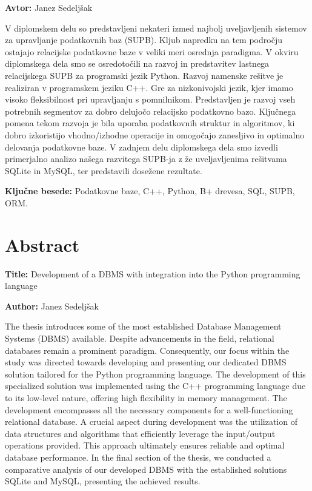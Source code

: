 \documentclass[a4paper,12pt,openright]{book}
\newcommand{\ttitleEn}{Development of a DBMS with integration into the Python programming language}
\newcommand{\tauthor}{Janez Sedeljšak}
\newcommand{\tkeywords}{Podatkovne baze, C++, Python, B+ drevesa, SQL, SUPB, ORM}
\newcommand{\clearemptydoublepage}{\newpage{\pagestyle{empty}\cleardoublepage}}
\begin{document}
\noindent\textbf{Avtor:} \tauthor
\bigskip

\noindent 
V diplomskem delu so predstavljeni nekateri izmed najbolj uveljavljenih sistemov za upravljanje podatkovnih baz (SUPB). Kljub napredku na tem področju ostajajo relacijske podatkovne baze v veliki meri osrednja paradigma. V okviru diplomskega dela smo se osredotočili na razvoj in predstavitev lastnega relacijskega SUPB za programski jezik Python. Razvoj namenske rešitve je realiziran v programskem jeziku C++. Gre za nizkonivojski jezik, kjer imamo 
 visoko fleksibilnost pri upravljanju s pomnilnikom. Predstavljen je razvoj vseh potrebnih segmentov za dobro delujočo relacijsko podatkovno bazo. Ključnega pomena tekom razvoja je bila uporaba podatkovnih struktur in algoritmov, ki dobro izkoristijo vhodno/izhodne operacije in omogočajo zanesljivo in optimalno delovanja podatkovne baze. V zadnjem delu diplomskega dela smo izvedli primerjalno analizo našega razvitega SUPB-ja z že uveljavljenima rešitvama SQLite in MySQL, ter predstavili dosežene rezultate.
\bigskip

\noindent\textbf{Ključne besede:} \tkeywords.
\clearemptydoublepage

{}
\chapter*{Abstract}

\noindent\textbf{Title:} \ttitleEn
\bigskip

\noindent\textbf{Author:} \tauthor
\bigskip

\noindent The thesis introduces some of the most established Database Management Systems (DBMS) available. Despite advancements in the field, relational databases remain a prominent paradigm. Consequently, our focus within the study was directed towards developing and presenting our dedicated DBMS solution tailored for the Python programming language. The development of this specialized solution was implemented using the C++ programming language due to its low-level nature, offering high flexibility in memory management. The development encompasses all the necessary components for a well-functioning relational database. A crucial aspect during development was the utilization of data structures and algorithms that efficiently leverage the input/output operations provided. This approach ultimately ensures reliable and optimal database performance. In the final section of the thesis, we conducted a comparative analysis of our developed DBMS with the established solutions SQLite and MySQL, presenting the achieved results.
\bigskip
\end{document}
